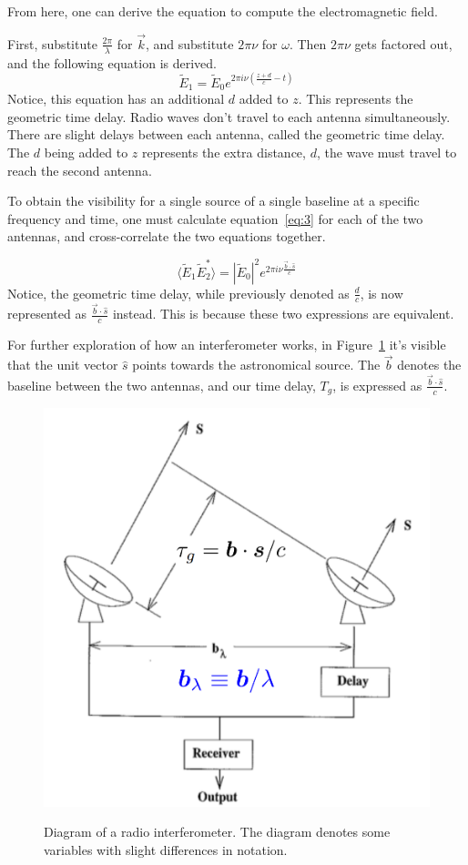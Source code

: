 \documentclass[12pt]{article}
\begin{document}
From here, one can derive the equation to compute the electromagnetic field. 

First, substitute $\frac{2\pi}{\lambda}$ for $\vec{k}$, and substitute $2\pi\nu$ for $\omega$. Then $2\pi\nu$ gets factored out, and the following equation is derived. 
\begin{equation}
\tilde{E}_1 = \tilde{E}_0 e^{2\pi i \nu \left( \frac{z + d}{c} - t \right)}
\label{eq:3}
\end{equation}
Notice, this equation has an additional $d$ added to $z$. This represents the geometric time delay. Radio waves don't travel to each antenna simultaneously. There are slight delays between each antenna, called the geometric time delay. The $d$ being added to $z$ represents the extra distance, $d$, the wave must travel to reach the second antenna.  

To obtain the visibility for a single source of a single baseline at a specific frequency and time, one must calculate equation~\ref{eq:3} for each of the two antennas, and cross-correlate the two equations together. 

\begin{equation}
\langle \tilde{E}_1 \tilde{E}_2^* \rangle = |\tilde{E}_0|^2 e^{2\pi i \nu \frac{\vec{b} \cdot \hat{s}}{c}}
\label{eq:4}
\end{equation}
Notice, the geometric time delay, while previously denoted as $\frac{d}{c}$, is now represented as $\frac{\vec{b} \cdot \hat{s}}{c}$ instead. This is because these two expressions are equivalent.

For further exploration of how an interferometer works, in Figure~\ref{fig:radio_interferometry_diagram} it's visible that the unit vector $\hat{s}$ points towards the astronomical source. The $\vec{b}$ denotes the baseline between the two antennas, and our time delay, $T_g$, is expressed as $\frac{\vec{b} \cdot \hat{s}}{c}$.
\begin{figure}[H]
    \centering
    \includegraphics[width=0.5\linewidth]{better_radio_interferometer.png}
    \caption{Diagram of a radio interferometer. The diagram denotes some variables with slight differences in notation.} \cite{[10]}
    \label{fig:radio_interferometry_diagram}
\end{figure}
\end{document}
